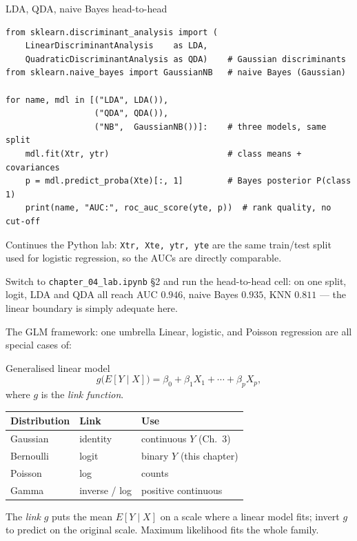 \documentclass[aspectratio=169,11pt]{beamer}
\begin{document}
\begin{frame}[fragile]{LDA, QDA, naive Bayes head-to-head}
  \begin{lstlisting}[basicstyle=\ttfamily\scriptsize]
from sklearn.discriminant_analysis import (
    LinearDiscriminantAnalysis    as LDA,
    QuadraticDiscriminantAnalysis as QDA)    # Gaussian discriminants
from sklearn.naive_bayes import GaussianNB   # naive Bayes (Gaussian)

for name, mdl in [("LDA", LDA()),
                  ("QDA", QDA()),
                  ("NB",  GaussianNB())]:    # three models, same split
    mdl.fit(Xtr, ytr)                        # class means + covariances
    p = mdl.predict_proba(Xte)[:, 1]         # Bayes posterior P(class 1)
    print(name, "AUC:", roc_auc_score(yte, p))  # rank quality, no cut-off
  \end{lstlisting}
  Continues the Python lab: \texttt{Xtr, Xte, ytr, yte} are the same
  train/test split used for logistic regression, so the AUCs are directly
  comparable.
  \begin{labnote}
    Switch to \texttt{chapter\_04\_lab.ipynb} \S2 and run the head-to-head cell: on one
    split, logit, LDA and QDA all reach AUC $0.946$, naive Bayes $0.935$, KNN $0.811$ ---
    the linear boundary is simply adequate here.
  \end{labnote}
\end{frame}


\begin{frame}{The GLM framework: one umbrella}
  Linear, logistic, and Poisson regression are all special cases of:
  \begin{block}{Generalised linear model}
    \[
      g\bigl(E[Y \mid X]\bigr) = \beta_0 + \beta_1 X_1 + \cdots + \beta_p X_p,
    \]
    where $g$ is the \emph{link function}.
  \end{block}
  \vspace{-2mm}
  \begin{center}\small
  \begin{tabular}{lll}
    \toprule
    Distribution & Link & Use \\
    \midrule
    Gaussian   & identity   & continuous $Y$ (Ch.~3) \\
    Bernoulli  & logit      & binary $Y$ (this chapter) \\
    Poisson    & log        & counts \\
    Gamma      & inverse / log & positive continuous \\
    \bottomrule
  \end{tabular}
  \end{center}
  \vspace{-2mm}
  \begin{readme}
    The \emph{link} $g$ puts the mean $E[Y\mid X]$ on a scale where a
    linear model fits; invert $g$ to predict on the original scale.
    Maximum likelihood fits the whole family.
  \end{readme}
\end{frame}
\end{document}
